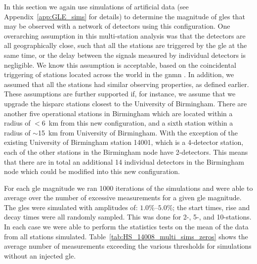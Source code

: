 In this section we again use simulations of artificial data (see Appendix~\ref{app:GLE_sims} for details) to determine the magnitude of \glspl{gle} that may be observed with a network of detectors using this configuration. One overarching assumption in this multi-station analysis was that the detectors are all geographically close, such that all the stations are triggered by the \gls{gle} at the same time, or the delay between the signals measured by individual detectors is negligible. We know this assumption is acceptable, based on the coincidental triggering of stations located across the world in the \gls{gnmn} \citep{mishev_current_2020}. In addition, we assumed that all the stations had similar observing properties, as defined earlier. These assumptions are further supported if, for instance, we assume that we upgrade the \gls{hisparc} stations closest to the University of Birmingham. There are another five operational stations in Birmingham which are located within a radius of $<6$~km from this new configuration, and a sixth station within a radius of $\sim$15~km from University of Birmingham. With the exception of the existing University of Birmingham station 14001, which is a 4-detector station, each of the other stations in the Birmingham node have 2-detectors. This means that there are in total an additional 14 individual detectors in the Birmingham node which could be modified into this new configuration.

For each \gls{gle} magnitude we ran 1000 iterations of the simulations and were able to average over the number of excessive measurements for a given \gls{gle} magnitude. The \glspl{gle} were simulated with amplitudes of: $1.0\%$--$5.0\%$; the start times, rise and decay times were all randomly sampled. This was done for 2-, 5-, and 10-stations. In each case we were able to perform the statistics tests on the mean of the data from all stations simulated. Table~\ref{tab:HS_14008_multi_sims_zeros} shows the average number of measurements exceeding the various thresholds for simulations without an injected \gls{gle}.

\vspace{1em}

